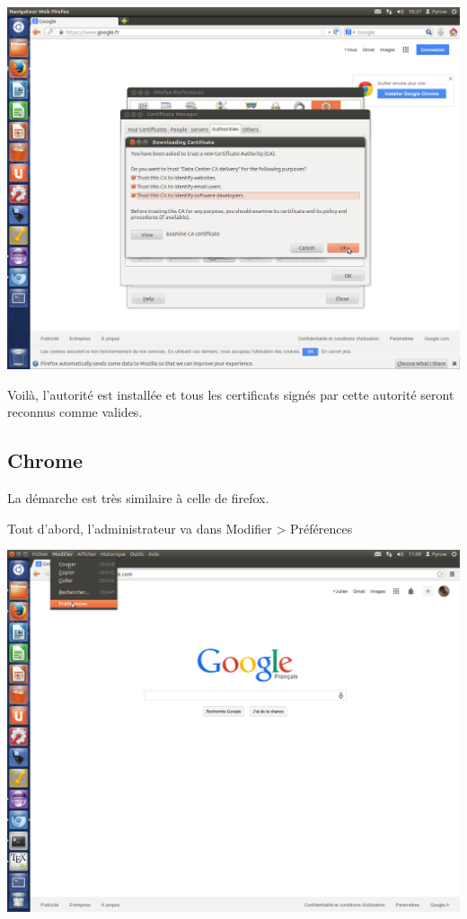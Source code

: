 \includegraphics[width=\textwidth]{images_autorites/OngletConfirm.png} 


Voilà, l'autorité est installée et tous les certificats signés par cette autorité seront reconnus comme valides.
\newpage
\subsection{Chrome}

La démarche est très similaire à celle de firefox.

Tout d'abord, l'administrateur va dans Modifier > Préférences

\includegraphics[width=\textwidth]{images_autorites/ChromePref.png} 
\newpage

